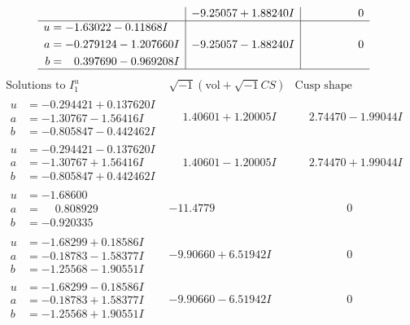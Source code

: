 \documentclass[1p]{elsarticle_modified}
\theoremstyle{definition}
\newcommand{\I}{\sqrt{-1}}
\begin{document}
$$\begin{array}{c|c|c}
 & -9.25057 + 1.88240 I & \phantom{-0.000000 } 0 \\ \hline\begin{aligned}
u &= -1.63022 - 0.11868 I \\
a &= -0.279124 - 1.207660 I \\
b &= \phantom{-}0.397690 - 0.969208 I\end{aligned}
 & -9.25057 - 1.88240 I & \phantom{-0.000000 } 0\\
 \hline 
 \end{array}$$\newpage$$\begin{array}{c|c|c}  
\text{Solutions to }I^u_{1}& \I (\text{vol} + \sqrt{-1}CS) & \text{Cusp shape}\\
 \hline 
\begin{aligned}
u &= -0.294421 + 0.137620 I \\
a &= -1.30767 - 1.56416 I \\
b &= -0.805847 - 0.442462 I\end{aligned}
 & \phantom{-}1.40601 + 1.20005 I & \phantom{-}2.74470 - 1.99044 I \\ \hline\begin{aligned}
u &= -0.294421 - 0.137620 I \\
a &= -1.30767 + 1.56416 I \\
b &= -0.805847 + 0.442462 I\end{aligned}
 & \phantom{-}1.40601 - 1.20005 I & \phantom{-}2.74470 + 1.99044 I \\ \hline\begin{aligned}
u &= -1.68600\phantom{ +0.000000I} \\
a &= \phantom{-}0.808929\phantom{ +0.000000I} \\
b &= -0.920335\phantom{ +0.000000I}\end{aligned}
 & -11.4779\phantom{ +0.000000I} & \phantom{-0.000000 } 0 \\ \hline\begin{aligned}
u &= -1.68299 + 0.18586 I \\
a &= -0.18783 - 1.58377 I \\
b &= -1.25568 - 1.90551 I\end{aligned}
 & -9.90660 + 6.51942 I & \phantom{-0.000000 } 0 \\ \hline\begin{aligned}
u &= -1.68299 - 0.18586 I \\
a &= -0.18783 + 1.58377 I \\
b &= -1.25568 + 1.90551 I\end{aligned}
 & -9.90660 - 6.51942 I & \phantom{-0.000000 } 0 \\ \hline\begin{aligned}

\end{aligned}
\end{array}$$
\end{document}
